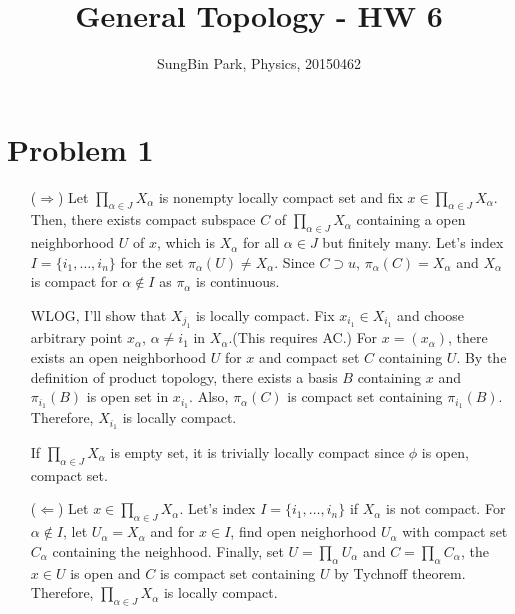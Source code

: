\documentclass{article}
\begin{document}
\title{General Topology - HW 6}
\author{SungBin Park, Physics, 20150462} 

 \maketitle
\section*{Problem 1}
\begin{enumerate}
\item[($\Rightarrow$)] Let $\prod_{\alpha\in J} X_\alpha$ is nonempty locally compact set and fix $x\in \prod_{\alpha\in J} X_\alpha$. Then, there exists compact subspace $C$ of $\prod_{\alpha\in J} X_\alpha$ containing a open neighborhood $U$ of $x$, which is $X_\alpha$ for all $\alpha\in J$ but finitely many. Let's index $I=\{i_1, \ldots, i_n\}$ for the set $\pi_\alpha(U)\neq X_\alpha$. Since $C\supset u$, $\pi_\alpha(C)=X_\alpha$ and $X_\alpha$ is compact for $\alpha\notin I$ as $\pi_\alpha$ is continuous.

WLOG, I'll show that $X_{j_1}$ is locally compact. Fix $x_{i_1}\in X_{i_1}$ and choose arbitrary point $x_\alpha$, $\alpha\neq i_1$ in $X_\alpha$.(This requires AC.) For $x=(x_\alpha)$, there exists an open neighborhood $U$ for $x$ and compact set $C$ containing $U$. By the definition of product topology, there exists a basis $B$ containing $x$ and $\pi_{i_1}(B)$ is open set in $x_{i_1}$. Also, $\pi_\alpha(C)$ is compact set containing $\pi_{i_1}(B)$. Therefore, $X_{i_1}$ is locally compact.

If $\prod_{\alpha\in J} X_\alpha$ is empty set, it is trivially locally compact since $\phi$ is open, compact set.
\item[($\Leftarrow$)] Let $x\in\prod_{\alpha\in J} X_\alpha$. Let's index $I=\{i_1, \ldots, i_n\}$ if $X_\alpha$ is not compact. For $\alpha\notin I$, let $U_\alpha=X_\alpha$ and for $x\in I$, find open neighorhood $U_\alpha$ with compact set $C_\alpha$ containing the neighhood. Finally, set $U=\prod_\alpha U_\alpha$ and $C=\prod_\alpha C_\alpha$, the $x\in U$ is open and $C$ is compact set containing $U$ by Tychnoff theorem. Therefore, $\prod_{\alpha\in J} X_\alpha$ is locally compact.
\end{enumerate}
\end{document}
